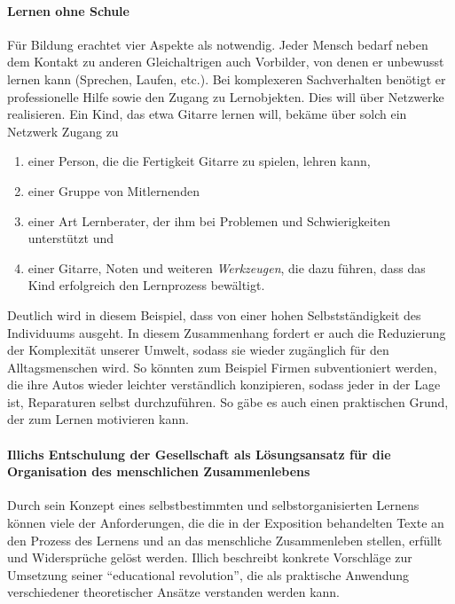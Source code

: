 \paragraph{Lernen ohne Schule}

Für Bildung erachtet \citeauthor{Illich-1971} vier Aspekte als notwendig.
Jeder Mensch bedarf neben dem Kontakt zu anderen Gleichaltrigen auch Vorbilder, von denen er unbewusst lernen kann (Sprechen, Laufen, etc.).
Bei komplexeren Sachverhalten benötigt er professionelle Hilfe sowie den Zugang zu Lernobjekten.
Dies will \citeauthor{Illich-1971} über Netzwerke realisieren.
Ein Kind, das etwa Gitarre lernen will, bekäme über solch ein Netzwerk Zugang zu
\begin{enumerate}
		\item einer Person, die die Fertigkeit Gitarre zu spielen, lehren kann,
		\item einer Gruppe von Mitlernenden
		\item einer Art Lernberater, der ihm bei Problemen und Schwierigkeiten unterstützt und
		\item einer Gitarre, Noten und weiteren \emph{Werkzeugen}, die dazu führen, dass das Kind erfolgreich den Lernprozess bewältigt.
\end{enumerate}
Deutlich wird in diesem Beispiel, dass \citeauthor{Illich-1971} von einer hohen Selbstständigkeit des Individuums ausgeht.
In diesem Zusammenhang fordert er auch die Reduzierung der Komplexität unserer Umwelt, sodass sie wieder zugänglich für den Alltagsmenschen wird.
So könnten zum Beispiel Firmen subventioniert werden, die ihre Autos wieder leichter verständlich konzipieren, sodass jeder in der Lage ist, Reparaturen selbst durchzuführen.
So gäbe es auch einen praktischen Grund, der zum Lernen motivieren kann.


\paragraph{Illichs Entschulung der Gesellschaft als Lösungsansatz für die Organisation des menschlichen Zusammenlebens}

Durch sein Konzept eines selbstbestimmten und selbstorganisierten Lernens können viele der Anforderungen, die die in der Exposition behandelten Texte an den Prozess des Lernens und an das menschliche Zusammenleben stellen, erfüllt und Widersprüche gelöst werden.
Illich beschreibt konkrete Vorschläge zur Umsetzung seiner ``educational revolution'', die als praktische Anwendung verschiedener theoretischer Ansätze verstanden werden kann.

